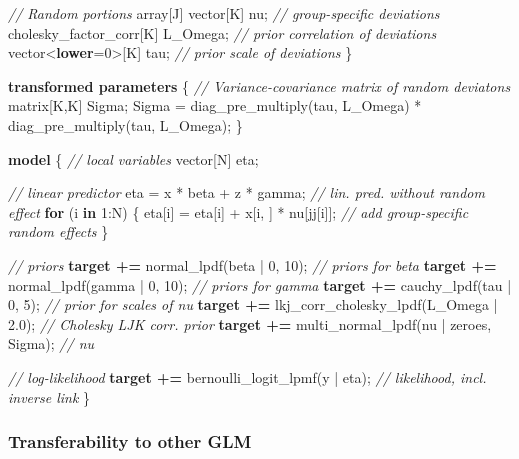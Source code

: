 \documentclass[
  11pt,
]{article}
\newenvironment{Shaded}{\begin{snugshade}}{\end{snugshade}}
\newcommand{\CommentTok}[1]{\textcolor[rgb]{0.56,0.35,0.01}{\textit{#1}}}
\newcommand{\ControlFlowTok}[1]{\textcolor[rgb]{0.13,0.29,0.53}{\textbf{#1}}}
\newcommand{\DataTypeTok}[1]{\textcolor[rgb]{0.13,0.29,0.53}{#1}}
\newcommand{\DecValTok}[1]{\textcolor[rgb]{0.00,0.00,0.81}{#1}}
\newcommand{\FloatTok}[1]{\textcolor[rgb]{0.00,0.00,0.81}{#1}}
\newcommand{\KeywordTok}[1]{\textcolor[rgb]{0.13,0.29,0.53}{\textbf{#1}}}
\newcommand{\NormalTok}[1]{#1}
\begin{document}
\begin{Shaded}
\begin{Highlighting}[]
  \CommentTok{// Random portions}
  \DataTypeTok{array}\NormalTok{[J] }\DataTypeTok{vector}\NormalTok{[K] nu;            }\CommentTok{// group{-}specific deviations}
  \DataTypeTok{cholesky\_factor\_corr}\NormalTok{[K] L\_Omega;  }\CommentTok{// prior correlation of deviations}
  \DataTypeTok{vector}\NormalTok{\textless{}}\KeywordTok{lower}\NormalTok{=}\DecValTok{0}\NormalTok{\textgreater{}[K] tau;           }\CommentTok{// prior scale of deviations}
\NormalTok{\}}

\KeywordTok{transformed parameters}\NormalTok{ \{}
  \CommentTok{// Variance{-}covariance matrix of random deviatons}
  \DataTypeTok{matrix}\NormalTok{[K,K] Sigma;}
\NormalTok{  Sigma = diag\_pre\_multiply(tau, L\_Omega) * diag\_pre\_multiply(tau, L\_Omega)\textquotesingle{};}
\NormalTok{\}}

\KeywordTok{model}\NormalTok{ \{}
  \CommentTok{// local variables}
  \DataTypeTok{vector}\NormalTok{[N] eta;}
  
  \CommentTok{// linear predictor}
\NormalTok{  eta = x * beta + z * gamma;               }\CommentTok{// lin. pred. without random effect}
  \ControlFlowTok{for}\NormalTok{ (i }\ControlFlowTok{in} \DecValTok{1}\NormalTok{:N) \{}
\NormalTok{    eta[i] = eta[i] + x[i, ] * nu[jj[i]];   }\CommentTok{// add group{-}specific random effects}
\NormalTok{  \}}
  
  \CommentTok{// priors}
  \KeywordTok{target +=}\NormalTok{ normal\_lpdf(beta | }\DecValTok{0}\NormalTok{, }\DecValTok{10}\NormalTok{);               }\CommentTok{// priors for beta}
  \KeywordTok{target +=}\NormalTok{ normal\_lpdf(gamma | }\DecValTok{0}\NormalTok{, }\DecValTok{10}\NormalTok{);              }\CommentTok{// priors for gamma}
  \KeywordTok{target +=}\NormalTok{ cauchy\_lpdf(tau | }\DecValTok{0}\NormalTok{, }\DecValTok{5}\NormalTok{);                 }\CommentTok{// prior for scales of nu}
  \KeywordTok{target +=}\NormalTok{ lkj\_corr\_cholesky\_lpdf(L\_Omega | }\FloatTok{2.0}\NormalTok{);   }\CommentTok{// Cholesky LJK corr. prior}
  \KeywordTok{target +=}\NormalTok{ multi\_normal\_lpdf(nu | zeroes, Sigma);   }\CommentTok{// nu}


  \CommentTok{// log{-}likelihood}
  \KeywordTok{target +=}\NormalTok{ bernoulli\_logit\_lpmf(y | eta); }\CommentTok{// likelihood, incl. inverse link}
\NormalTok{\}}
\end{Highlighting}
\end{Shaded}

\hypertarget{transferability-to-other-glm}{%
\subsubsection{Transferability to other GLM}\label{transferability-to-other-glm}}
\end{document}
